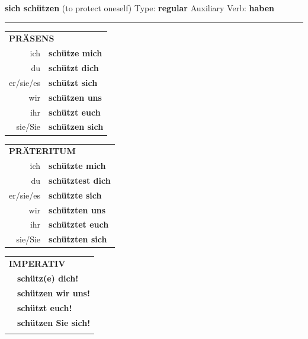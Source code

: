 \documentclass[10pt,a4paper]{revtex4-2}
\begin{document}
\begin{verbbox}
    {\Large \bf sich schützen} (to protect oneself) \hfill Type: \textbf{regular} \hfill Auxiliary Verb: \textbf{haben} 
    
     \vspace{5pt}

    \hrule
    
    \vspace{5pt}

  \begin{tabular}{rl}
     \multicolumn{2}{l}{\textbf{PRÄSENS} }\\
    ich & \textbf{schütze mich}\\
    du & \textbf{schützt dich}\\
    er/sie/es & \textbf{schützt sich}\\
    wir & \textbf{schützen uns}\\
    ihr & \textbf{schützt euch}\\
    sie/Sie & \textbf{schützen sich}\\
  \end{tabular}
  \hfill
     \begin{tabular}{rl}
    \multicolumn{2}{l}{\textbf{PRÄTERITUM} }\\
    ich & \textbf{schützte mich}\\
    du & \textbf{schütztest dich}\\
    er/sie/es & \textbf{schützte sich}\\
    wir & \textbf{schützten uns}\\
    ihr & \textbf{schütztet euch}\\
    sie/Sie & \textbf{schützten sich}\\
  \end{tabular}
  \hfill
  \begin{tabular}{rl}
     \multicolumn{2}{l}{\textbf{IMPERATIV} }\\
   & \textbf{schütz(e) dich!}\\
   & \textbf{schützen wir uns!}\\
   & \textbf{schützt euch!}\\
   & \textbf{schützen Sie sich!}\\
   & \vspace{10pt}
  \end{tabular}

    \vspace{10pt}


\end{verbbox}
\end{document}
